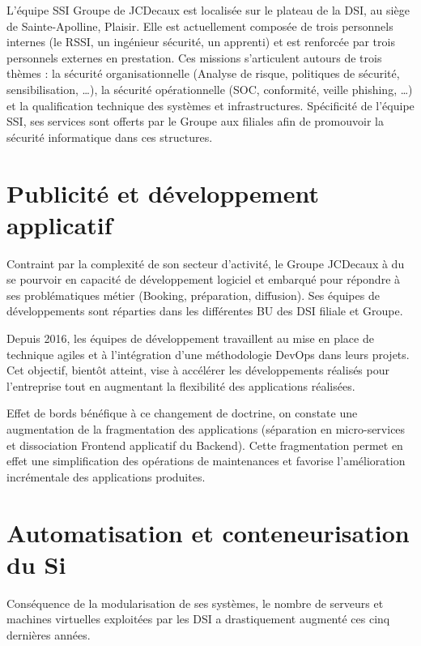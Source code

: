 L'équipe \ac{SSI} Groupe de JCDecaux est localisée sur le plateau de la \ac{DSI}, au siège de Sainte-Apolline, Plaisir.
Elle est actuellement composée de trois personnels internes (le \ac{RSSI}, un ingénieur sécurité, un apprenti) et est 
renforcée par trois personnels externes en prestation.
\newline Ces missions s'articulent autours de trois thèmes : la sécurité organisationnelle (Analyse de risque, 
politiques de sécurité, sensibilisation, \dots), la sécurité opérationnelle (SOC, conformité, veille phishing, \dots) et 
la qualification technique des systèmes et infrastructures.
\newline Spécificité de l'équipe \ac{SSI}, ses services sont offerts par le Groupe aux filiales afin de promouvoir la 
sécurité informatique dans ces structures.

\section{Publicité et développement applicatif}
Contraint par la complexité de son secteur d'activité, le Groupe JCDecaux à du se pourvoir en capacité de développement
logiciel et embarqué pour répondre à ses problématiques métier (\eg Booking, préparation, diffusion).
Ses équipes de développements sont réparties dans les différentes \ac{BU} des \ac{DSI} filiale et Groupe.

Depuis 2016, les équipes de développement travaillent au mise en place de technique agiles et à l'intégration d'une 
méthodologie DevOps dans leurs projets. Cet objectif, bientôt atteint, vise à accélérer les développements réalisés pour 
l'entreprise tout en augmentant la flexibilité des applications réalisées. 

Effet de bords bénéfique à ce changement de doctrine, on constate une augmentation de la fragmentation des applications
(séparation en micro-services et dissociation Frontend applicatif du Backend). Cette fragmentation permet en effet une
simplification des opérations de maintenances et favorise l'amélioration incrémentale des applications produites.

\section{Automatisation et conteneurisation du Si}
Conséquence de la modularisation de ses systèmes, le nombre de serveurs et machines virtuelles exploitées par les 
\ac{DSI} a drastiquement augmenté ces cinq dernières années.

